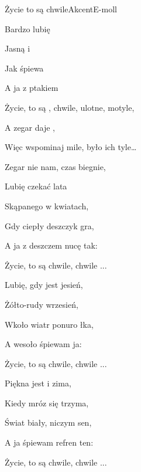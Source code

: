 \begin{song}{Życie to są chwile}{}{}{Akcent}{E-moll}{}
\begin{SBVerse}
  Bardzo lubię 

Jasną i 

Jak śpiewa 

A ja z ptakiem 
\end{SBVerse}
\begin{SBChorus}
Życie, to są , chwile,  ulotne,  motyle, 

A zegar daje ,   

Więc wspominaj  mile,  było ich  tyle… 

Zegar nie  nam,  czas biegnie, 
\end{SBChorus}
\begin{SBVerse}
Lubię czekać lata

Skąpanego w kwiatach,

Gdy ciepły deszczyk gra,

A ja z deszczem nucę tak:
\end{SBVerse}

\begin{SBChorus}
Życie, to są chwile, chwile ...
\end{SBChorus}

\begin{SBVerse}
Lubię, gdy jest jesień,

Żółto-rudy wrzesień,

Wkoło wiatr ponuro łka,

A wesoło śpiewam ja:
\end{SBVerse}

\begin{SBChorus}
Życie, to są chwile, chwile ...
\end{SBChorus}

\begin{SBVerse}
Piękna jest i zima,

Kiedy mróz się trzyma,

Świat biały, niczym sen,

A ja śpiewam refren ten:
\end{SBVerse}

\begin{SBChorus}
Życie, to są chwile, chwile ...
\end{SBChorus}

\end{song}

